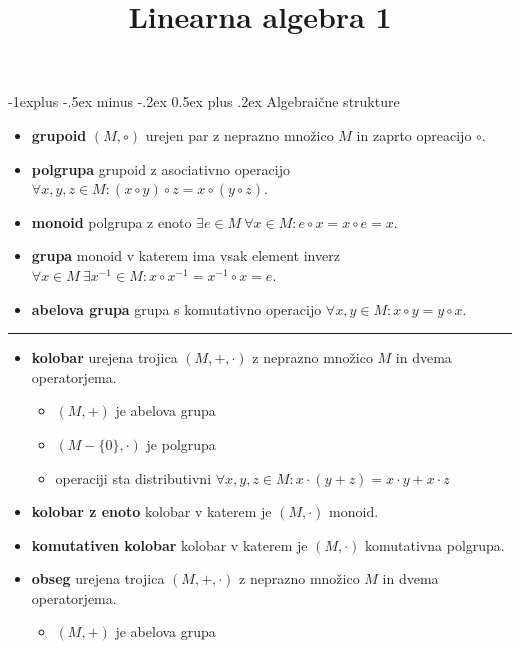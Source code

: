 \documentclass[a4paper,landscape]{article}
\title{Linearna algebra 1}
\makeatletter
\renewcommand{\subsection}{\@startsection{subsection}{2}{0mm}%
                                {-1explus -.5ex minus -.2ex}%
                                {0.5ex plus .2ex}%
                                {\normalfont\normalsize\bfseries}}
\makeatother
\begin{document}
\raggedright
\footnotesize

\begin{multicols}{3}
\setlength{\premulticols}{1pt}
\setlength{\postmulticols}{1pt}
\setlength{\multicolsep}{1pt}
\setlength{\columnsep}{2pt}

\subsection{Algebraične strukture}

\begin{itemize}
    \item \textbf{grupoid} $(M, \circ)$ urejen par z neprazno množico $M$ in zaprto opreacijo $\circ$.
    \item \textbf{polgrupa} grupoid z asociativno operacijo $ \forall x,y,z \in M : (x\circ y)\circ z = x\circ (y\circ z)$.
    \item \textbf{monoid} polgrupa z enoto $ \exists e \in M \ \forall x \in M : e\circ x = x\circ e = x$.
    \item \textbf{grupa} monoid v katerem ima vsak element inverz $ \forall x \in M \ \exists x^{-1} \in M : x\circ x^{-1} = x^{-1}\circ x = e$.
    \item \textbf{abelova grupa} grupa s komutativno operacijo $ \forall x,y \in M  : x\circ y = y\circ x$.
\end{itemize} 
\noindent\rule{2cm}{0.4pt}
\begin{itemize}
    \item \textbf{kolobar} urejena trojica $(M, +, \cdot)$ z neprazno množico $M$ in dvema operatorjema.
    \begin{itemize}
        \item $(M,+)$ je abelova grupa
        \item $(M-\{0\},\cdot)$ je polgrupa
        \item operaciji sta distributivni $\forall x,y,z \in M : x\cdot (y+z) = x\cdot y + x \cdot z$
    \end{itemize}
    \item \textbf{kolobar z enoto} kolobar v katerem je $(M, \cdot)$ monoid.
    \item \textbf{komutativen kolobar} kolobar v katerem je $(M, \cdot)$ komutativna polgrupa.
    \item \textbf{obseg} urejena trojica $(M, +, \cdot)$ z neprazno množico $M$ in dvema operatorjema.
    \begin{itemize}
        \item $(M,+)$ je abelova grupa

\end{itemize}
\end{itemize}
\end{multicols}
\end{document}

